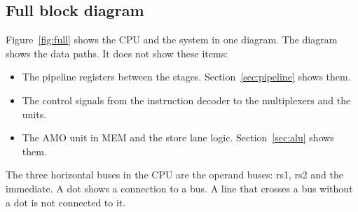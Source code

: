 \subsection{Full block diagram}
\label{sec:fullblock}

Figure~\ref{fig:full} shows the CPU and the system in one diagram. The diagram shows the data paths. It does not show these items:

\begin{itemize}
  \item The pipeline registers between the stages. Section~\ref{sec:pipeline} shows them.
  \item The control signals from the instruction decoder to the multiplexers and the units.
  \item The AMO unit in MEM and the store lane logic. Section~\ref{sec:alu} shows them.
\end{itemize}

The three horizontal buses in the CPU are the operand buses: rs1, rs2 and the immediate. A dot shows a connection to a bus. A line that crosses a bus without a dot is not connected to it.

